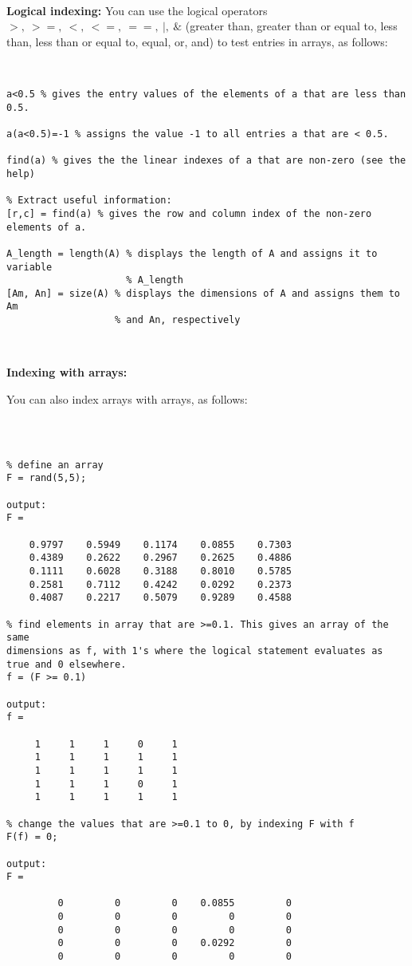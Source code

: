 \documentclass[11pt]{amsart}
\begin{document}
\

{\bf Logical indexing:} You can use the logical operators $>,\ >=,\ <,\ <=,\ ==,\ |,\ \&$ (greater than, greater than or equal to, less than, less than or equal to, equal, or, and) to test entries in arrays, as follows:

\

\color{blue}
\begin{verbatim}
a<0.5 % gives the entry values of the elements of a that are less than 0.5.

a(a<0.5)=-1 % assigns the value -1 to all entries a that are < 0.5.

find(a) % gives the the linear indexes of a that are non-zero (see the help)

% Extract useful information:
[r,c] = find(a) % gives the row and column index of the non-zero elements of a.
 
A_length = length(A) % displays the length of A and assigns it to variable
                     % A_length
[Am, An] = size(A) % displays the dimensions of A and assigns them to Am
                   % and An, respectively
\end{verbatim}
\color{black}

\

{\bf Indexing with arrays:} 

You can also index arrays with arrays, as follows:

\

\color{blue}
\begin{verbatim}

% define an array 
F = rand(5,5);   

output:
F =

    0.9797    0.5949    0.1174    0.0855    0.7303
    0.4389    0.2622    0.2967    0.2625    0.4886
    0.1111    0.6028    0.3188    0.8010    0.5785
    0.2581    0.7112    0.4242    0.0292    0.2373
    0.4087    0.2217    0.5079    0.9289    0.4588

% find elements in array that are >=0.1. This gives an array of the same 
dimensions as f, with 1's where the logical statement evaluates as true and 0 elsewhere.
f = (F >= 0.1)

output:
f =

     1     1     1     0     1
     1     1     1     1     1
     1     1     1     1     1
     1     1     1     0     1
     1     1     1     1     1

% change the values that are >=0.1 to 0, by indexing F with f
F(f) = 0;

output:
F =

         0         0         0    0.0855         0
         0         0         0         0         0
         0         0         0         0         0
         0         0         0    0.0292         0
         0         0         0         0         0
\end{verbatim}
\color{black}
\end{document}
